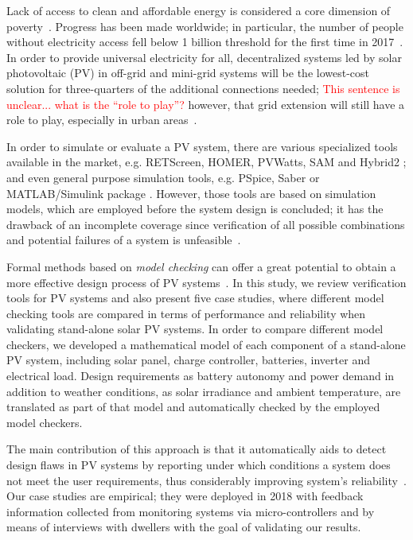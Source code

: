 \documentclass[runningheads]{llncs}
\begin{document}
Lack of access to clean and affordable energy is considered a core dimension of poverty~\cite{Hussein2012}. Progress has been made worldwide; in particular, the number of people without electricity access fell below 1 billion threshold for the first time in 2017~\cite{IEAweo2018}. In order to provide universal electricity for all, decentralized systems led by solar photovoltaic (PV) in off-grid and mini-grid systems will be the lowest-cost solution for three-quarters of the additional connections needed; \textcolor{red}{This sentence is unclear... what is the ``role to play''?} however, that grid extension will still have a role to play, especially in urban areas~\cite{IEAweo2018}.

In order to simulate or evaluate a PV system, there are various specialized tools available in the market, e.g. RETScreen, HOMER, PVWatts, SAM and Hybrid2 \cite{Pradhan,Swarnkar,NRELDobos,NRELBlair,Mills}; and even general purpose simulation tools, e.g. PSpice, Saber or MATLAB/Simulink package \cite{Gow1999,Benatiallah2017}. However, those tools are based on simulation models, which are employed before the system design is concluded; it has the drawback of an incomplete coverage since verification of all possible combinations and potential failures of a system is unfeasible~\cite{ClarkeHV18}.

Formal methods based on \textit{model checking} can offer a great potential to obtain a more effective design process of PV systems~\cite{ClarkeHV18}. In this study, we review verification tools for PV systems and also present five case studies, where different model checking tools are compared in terms of performance and reliability when validating stand-alone solar PV systems. In order to compare different model checkers, we developed a mathematical model of each component of a stand-alone PV system, including solar panel, charge controller, batteries, inverter and electrical load. Design requirements as battery autonomy and power demand in addition to weather conditions, as solar irradiance and ambient temperature, are translated as part of that model and automatically checked by the employed model checkers. 

The main contribution of this approach is that it automatically aids to detect design flaws in PV systems by reporting under which conditions a system does not meet the user requirements, thus considerably improving system's reliability~\cite{Akram2018}. Our case studies are empirical; they were deployed in 2018 with feedback information collected from monitoring systems via micro-controllers and by means of interviews with dwellers with the goal of validating our results. 
\end{document}
